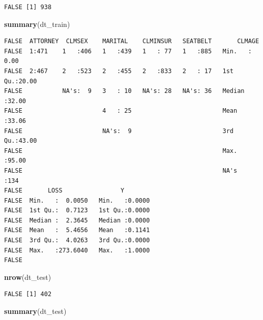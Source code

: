 \documentclass[]{book}
\newenvironment{Shaded}{\begin{snugshade}}{\end{snugshade}}
\newcommand{\KeywordTok}[1]{\textcolor[rgb]{0.13,0.29,0.53}{\textbf{#1}}}
\newcommand{\NormalTok}[1]{#1}
\begin{document}
\begin{verbatim}
FALSE [1] 938
\end{verbatim}

\begin{Shaded}
\begin{Highlighting}[]
\KeywordTok{summary}\NormalTok{(dt_train)}
\end{Highlighting}
\end{Shaded}

\begin{verbatim}
FALSE  ATTORNEY  CLMSEX    MARITAL    CLMINSUR   SEATBELT       CLMAGE     
FALSE  1:471    1   :406   1   :439   1   : 77   1   :885   Min.   : 0.00  
FALSE  2:467    2   :523   2   :455   2   :833   2   : 17   1st Qu.:20.00  
FALSE           NA's:  9   3   : 10   NA's: 28   NA's: 36   Median :32.00  
FALSE                      4   : 25                         Mean   :33.06  
FALSE                      NA's:  9                         3rd Qu.:43.00  
FALSE                                                       Max.   :95.00  
FALSE                                                       NA's   :134    
FALSE       LOSS                Y         
FALSE  Min.   :  0.0050   Min.   :0.0000  
FALSE  1st Qu.:  0.7123   1st Qu.:0.0000  
FALSE  Median :  2.3645   Median :0.0000  
FALSE  Mean   :  5.4656   Mean   :0.1141  
FALSE  3rd Qu.:  4.0263   3rd Qu.:0.0000  
FALSE  Max.   :273.6040   Max.   :1.0000  
FALSE 
\end{verbatim}

\begin{Shaded}
\begin{Highlighting}[]
\KeywordTok{nrow}\NormalTok{(dt_test)}
\end{Highlighting}
\end{Shaded}

\begin{verbatim}
FALSE [1] 402
\end{verbatim}

\begin{Shaded}
\begin{Highlighting}[]
\KeywordTok{summary}\NormalTok{(dt_test)}
\end{Highlighting}
\end{Shaded}
\end{document}

